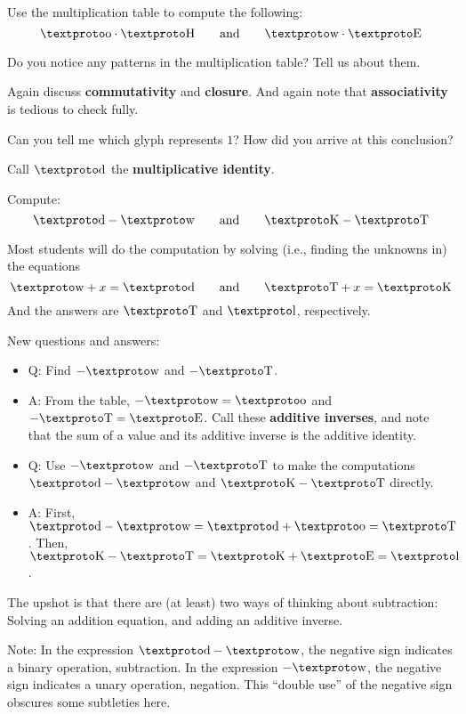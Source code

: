 \begin{prob} 
Use the multiplication table to compute the following:
\[
\li \cdot \lb \qquad\text{and}\qquad \la \cdot \lf
\]
\end{prob}

\begin{prob} 
Do you notice any patterns in the multiplication table? Tell us about them.
\begin{teachingnote}
Again discuss \textbf{commutativity} and \textbf{closure}.  And again note that \textbf{associativity} is tedious to check fully.  
\end{teachingnote}

\end{prob}

\begin{prob} 
Can you tell me which glyph represents $1$? How did you arrive at this
conclusion?
\begin{teachingnote}
Call $\loo$ the \textbf{multiplicative identity}.  
\end{teachingnote}
\end{prob}


\begin{prob} Compute:
\[
\loo - \la \qquad\text{and}\qquad \ld - \lc
\]
\begin{teachingnote}
Most students will do the computation by solving (i.e., finding the unknowns in) the equations  
\[
\la + x = \loo  \qquad\text{and}\qquad \lc + x = \ld
\]
And the answers are $\lc$ and $\lh$, respectively.  

New questions and answers:  
\begin{itemize}
\item Q: Find $-\la$ and $-\lc$.  
\item A: From the table, $-\la=\li$ and $-\lc=\lf$.  Call these \textbf{additive inverses}, and note that the sum of a value and its additive inverse is the additive identity.  
\item Q: Use $-\la$ and $-\lc$ to make the computations $\loo - \la$ and $\ld - \lc$ directly. 
\item A: First, $\loo - \la = \loo + \li =\lc$.  Then, $\ld - \lc = \ld + \lf = \lh$.  
\end {itemize}

The upshot is that there are (at least) two ways of thinking about subtraction:  Solving an addition equation, and adding an additive inverse.  

Note: In the expression $\loo - \la$, the negative sign indicates a binary operation, subtraction.  In the expression $-\la$, the negative sign indicates a unary operation, negation.  This ``double use'' of the negative sign obscures some subtleties here.  
\end{teachingnote}
\end{prob}


